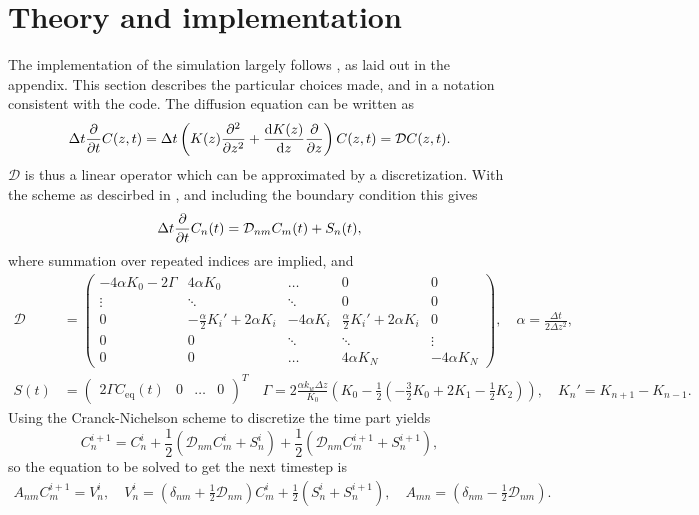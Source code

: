 \documentclass{article}
\begin{document}
    \section*{Theory and implementation}
    The implementation of the simulation largely follows \cite{exercise}, as laid out in the appendix.
    This section describes the particular choices made, and in a notation consistent with the code.
    The diffusion equation can be written as
    \begin{equation*}
        \Delta t \pdv{t} C(z, t) = \Delta t \left(K(z) \pdv[2]{z} + \dv{K(z)}{z}\pdv{z}\right) C(z, t) = \mathcal{D} C(z, t).
    \end{equation*}
    $\mathcal{D}$ is thus a linear operator which can be approximated by a discretization.
    With the scheme as descirbed in \cite{exercise}, and including the boundary condition this gives   
    \begin{equation*}
        \Delta t \pdv{t} C_n(t) = \mathcal{D}_{nm} C_m(t) + S_n(t),
    \end{equation*}
    where summation over repeated indices are implied, and
    \begin{align*}
        \mathcal{D} &=
        \begin{pmatrix}
            -4\alpha K_0 - 2\Gamma & 4\alpha K_0 & \dots & 0 & 0 \\
            \vdots & \ddots & \ddots & 0 & 0\\
            0 & -\frac{\alpha}{2} K_i' + 2\alpha K_i & -4 \alpha K_i & \frac{\alpha}{2}K_i' + 2\alpha K_i & 0 \\
            0 & 0 & \ddots & \ddots & \vdots\\
            0 & 0 & \dots & 4\alpha K_N & -4\alpha K_N
        \end{pmatrix}, \quad \alpha = \frac{\Delta t}{2 \Delta z^2 },\\
        S(t) & =  
        \begin{pmatrix}
            2\Gamma C_\mathrm{eq}(t) &0&\dots&0
        \end{pmatrix}^T \quad 
    \Gamma = 2 \frac{\alpha k_w \Delta z}{K_0} \left(K_0 - \frac{1}{2}(-\frac{3}{2} K_0 + 2K_1 - \frac{1}{2}K_2)\right), \quad
      K_n' = K_{n+1} - K_{n-1}.
    \end{align*}
    Using the Cranck-Nichelson scheme to discretize the time part yields
    \begin{equation*}
        C_n^{i+1}  = C_n^i + \frac{1}{2} (\mathcal{D}_{nm} C_m^i + S_n^i) + \frac{1}{2} (\mathcal{D}_{nm} C_m^{i+1} + S_n^{i+1}),
    \end{equation*}
    so the equation to be solved to get the next timestep is
    \begin{align*}
        A_{nm} C_{m}^{i+1} = V_n^i, \quad V_n^i = \left(\delta_{nm} + \frac{1}{2} \mathcal{D}_{nm}\right) C_m^i + \frac{1}{2}(S_n^i + S_n^{i+1}), \quad 
        A_{mn} = \left(\delta_{nm} - \frac{1}{2} \mathcal{D}_{nm}\right).
    \end{align*}
    
\end{document}
